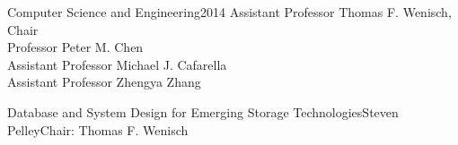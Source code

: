 \documentclass[reqno,12pt,oneside]{report} %
\theoremstyle{plain}
\theoremstyle{definition}
\theoremstyle{remark}
\numberwithin{theorem}{chapter}     %
\begin{document}

{Computer Science and Engineering}{2014}
{Assistant Professor Thomas F. Wenisch, Chair\\
 Professor Peter M. Chen\\
 Assistant Professor Michael J. Cafarella\\
 Assistant Professor Zhengya Zhang}

\initializefrontsections



\makeatletter
\if@twoside \setcounter{page}{4} \else \setcounter{page}{0} \fi
\makeatother
 

\startacknowledgementspage

\label{Acknowledgements}

%

\tableofcontents     %
\listoffigures       %
\listoftables        %
\listofappendices    %

\startabstractpage
{Database and System Design for Emerging Storage Technologies}{Steven Pelley}{Chair: Thomas F. Wenisch}

\label{Abstract}

\startthechapters 
\end{document}
